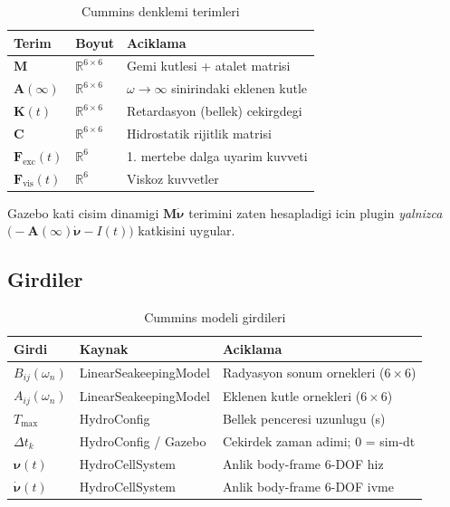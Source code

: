 \documentclass[12pt,a4paper]{article}
\newcommand{\nuvec}{\boldsymbol{\nu}}
\newcommand{\nudot}{\dot{\boldsymbol{\nu}}}
\newcommand{\Fvec}{\mathbf{F}}
\newcommand{\Kvec}{\mathbf{K}}
\newcommand{\Cvec}{\mathbf{C}}
\newcommand{\Ainf}{\mathbf{A}(\infty)}
\begin{document}
\begin{table}[H]
  \centering
  \caption{Cummins denklemi terimleri}
  \begin{tabularx}{\linewidth}{llX}
    \toprule
    \textbf{Terim} & \textbf{Boyut} & \textbf{Aciklama} \\
    \midrule
    $\mathbf{M}$ & $\mathbb{R}^{6\times6}$ & Gemi kutlesi + atalet matrisi \\
    $\Ainf$ & $\mathbb{R}^{6\times6}$ & $\omega\to\infty$ sinirindaki eklenen kutle \\
    $\Kvec(t)$ & $\mathbb{R}^{6\times6}$ & Retardasyon (bellek) cekirgdegi \\
    $\Cvec$ & $\mathbb{R}^{6\times6}$ & Hidrostatik rijitlik matrisi \\
    $\Fvec_{\text{exc}}(t)$ & $\mathbb{R}^6$ & 1. mertebe dalga uyarim kuvveti \\
    $\Fvec_{\text{vis}}(t)$ & $\mathbb{R}^6$ & Viskoz kuvvetler \\
    \bottomrule
  \end{tabularx}
\end{table}

Gazebo kati cisim dinamigi $\mathbf{M}\nudot$ terimini zaten hesapladigi icin
plugin \emph{yalnizca} $\bigl(-\Ainf\nudot - I(t)\bigr)$ katkisini uygular.

\subsection{Girdiler}

\begin{table}[H]
  \centering
  \caption{Cummins modeli girdileri}
  \begin{tabularx}{\linewidth}{llX}
    \toprule
    \textbf{Girdi} & \textbf{Kaynak} & \textbf{Aciklama} \\
    \midrule
    $B_{ij}(\omega_n)$ & LinearSeakeepingModel & Radyasyon sonum ornekleri ($6\times6$) \\
    $A_{ij}(\omega_n)$ & LinearSeakeepingModel & Eklenen kutle ornekleri ($6\times6$) \\
    $T_{\max}$ & HydroConfig & Bellek penceresi uzunlugu (s) \\
    $\Delta t_k$ & HydroConfig / Gazebo & Cekirdek zaman adimi; 0 = sim-dt \\
    $\nuvec(t)$ & HydroCellSystem & Anlik body-frame 6-DOF hiz \\
    $\nudot(t)$ & HydroCellSystem & Anlik body-frame 6-DOF ivme \\
    \bottomrule
  \end{tabularx}
\end{table}
\end{document}
